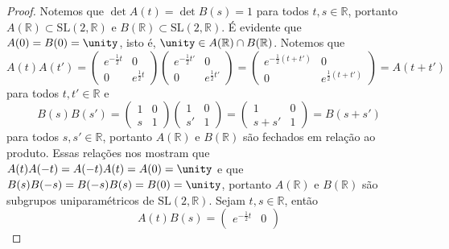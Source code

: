 \begin{proof}
    Notemos que \(\det{A(t)} = \det{B(s)} = 1\) para todos \(t, s \in \mathbb{R}\), portanto \(A(\mathbb{R})\subset \mathrm{SL}(2,\mathbb{R})\) e \(B(\mathbb{R}) \subset \mathrm{SL}(2, \mathbb{R})\). É evidente que \(A(0) = B(0) = \unity\), isto é, \(\unity \in A(\mathbb{R}) \cap B(\mathbb{R})\). Notemos que
    \begin{equation*}
        A(t)A(t') = \begin{pmatrix}
            e^{-\frac12t} & 0\\
            0 & e^{\frac12 t}
            \end{pmatrix}\begin{pmatrix}
            e^{-\frac12t'} & 0\\
            0 & e^{\frac12 t'}
            \end{pmatrix}= \begin{pmatrix}
            e^{-\frac12(t + t')} & 0\\
            0 & e^{\frac12 (t + t')}
        \end{pmatrix} = A(t + t')
    \end{equation*}
    para todos \(t, t' \in \mathbb{R}\) e
    \begin{equation*}
        B(s)B(s') = \begin{pmatrix}
            1 & 0\\
            s & 1
        \end{pmatrix}
        \begin{pmatrix}
            1 & 0\\
            s' & 1
        \end{pmatrix} =
        \begin{pmatrix}
            1 & 0\\
            s + s' & 1
        \end{pmatrix} = B(s + s')
    \end{equation*}
    para todos \(s,s' \in \mathbb{R}\), portanto \(A(\mathbb{R})\) e \(B(\mathbb{R})\) são fechados em relação ao produto. Essas relações nos mostram que \(A(t)A(-t) = A(-t)A(t) = A(0)=\unity\) e que \(B(s)B(-s) = B(-s)B(s) = B(0) = \unity\), portanto \(A(\mathbb{R})\) e \(B(\mathbb{R})\) são subgrupos uniparamétricos de \(\mathrm{SL}(2, \mathbb{R})\). Sejam \(t,s\in \mathbb{R}\), então
    \begin{equation*}
        A(t)B(s) = \begin{pmatrix}
            e^{-\frac12 t} & 0\\

\end{pmatrix}
\end{equation*}
\end{proof}
